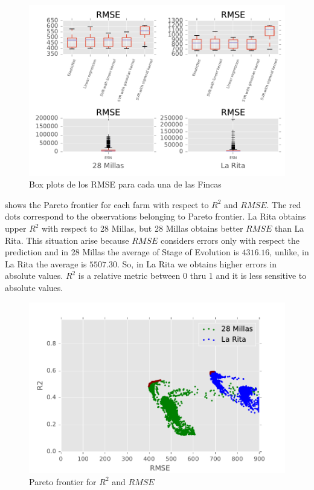 %
\begin{figure}[H] 
 \centering
 \includegraphics[scale=.8]{Usado_2017-04-30_Sigatoka_RMSE_Boxplot_4}
 \caption{Box plots de los RMSE para cada una de las Fincas} 
 \label{figura4} 
\end{figure}
%
 shows the Pareto frontier for each farm with respect to $R^2$ and $RMSE$. The red dots correspond to the observations belonging to Pareto frontier. La Rita obtains upper $R^2$ with respect to 28 Millas, but 28 Millas obtains better $RMSE$ than La Rita. This situation arise because $RMSE$ considers errors only with respect the prediction and in 28 Millas the average of Stage of Evolution is $4316.16$, unlike, in La Rita the average is $5507.30$. So, in La Rita we obtains higher errors in absolute values. $R^2$  is a relative metric between 0 thru 1 and it is less sensitive to absolute values.
%
\begin{figure}[H] 
 \centering
 \includegraphics[scale=.8]{Usado_2017-04-30_Sigatoka_R2_RMSE}
 \caption{Pareto frontier for $R^2$ and $RMSE$} 
 \label{figura5} 
\end{figure}

